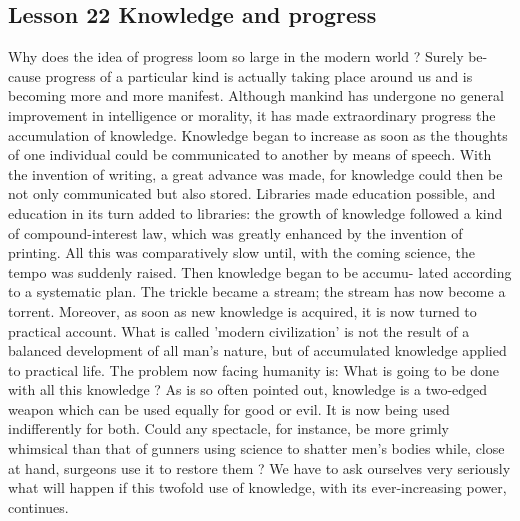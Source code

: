 \documentclass[kindlepaper]{BHCexam4kindle}
\begin{document}
\subsection{Lesson 22
Knowledge and progress}
\par
Why does the idea of progress loom so large in the modern world ? Surely be-
cause progress of a particular kind is actually taking place around us and is
becoming more and more manifest. Although mankind has undergone no general
improvement in intelligence or morality, it has made extraordinary progress
the accumulation of knowledge. Knowledge began to increase as soon as the
thoughts of one individual could be communicated to another by means of
speech. With the invention of writing, a great advance was made, for knowledge
could then be not only communicated but also stored. Libraries made education
possible, and education in its turn added to libraries: the growth of knowledge
followed a kind of compound-interest law, which was greatly enhanced by the
invention of printing. All this was comparatively slow until, with the coming
science, the tempo was suddenly raised. Then knowledge began to be accumu-
lated according to a systematic plan. The trickle became a stream; the stream
has now become a torrent. Moreover, as soon as new knowledge is acquired, it
is now turned to practical account. What is called 'modern civilization' is not
the result of a balanced development of all man's nature, but of accumulated
knowledge applied to practical life. The problem now facing humanity is: What
is going to be done with all this knowledge ? As is so often pointed out, knowledge
is a two-edged weapon which can be used equally for good or evil. It is now being
used indifferently for both. Could any spectacle, for instance, be more grimly
whimsical than that of gunners using science to shatter men's bodies while, close
at hand, surgeons use it to restore them ? We have to ask ourselves very seriously
what will happen if this twofold use of knowledge, with its ever-increasing
power, continues.
\clearpage
\end{document}
